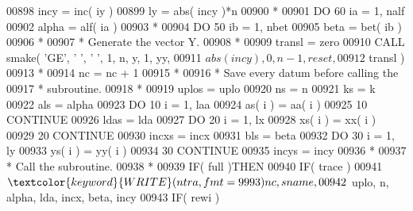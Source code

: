 \begin{DoxyCode}
00898                      incy = inc( iy )
00899                      ly = abs( incy )*n
00900 \textcolor{comment}{*}
00901                      \textcolor{keywordflow}{DO} 60 ia = 1, nalf
00902                         alpha = alf( ia )
00903 \textcolor{comment}{*}
00904                         \textcolor{keywordflow}{DO} 50 ib = 1, nbet
00905                            beta = bet( ib )
00906 \textcolor{comment}{*}
00907 \textcolor{comment}{*                          Generate the vector Y.}
00908 \textcolor{comment}{*}
00909                            transl = zero
00910                            \textcolor{keyword}{CALL }smake( \textcolor{stringliteral}{'GE'}, \textcolor{stringliteral}{' '}, \textcolor{stringliteral}{' '}, 1, n, y, 1, yy,
00911      $                                 abs( incy ), 0, n - 1, reset,
00912      $                                 transl )
00913 \textcolor{comment}{*}
00914                            nc = nc + 1
00915 \textcolor{comment}{*}
00916 \textcolor{comment}{*                          Save every datum before calling the}
00917 \textcolor{comment}{*                          subroutine.}
00918 \textcolor{comment}{*}
00919                            uplos = uplo
00920                            ns = n
00921                            ks = k
00922                            als = alpha
00923                            \textcolor{keywordflow}{DO} 10 i = 1, laa
00924                               as( i ) = aa( i )
00925    10                      \textcolor{keywordflow}{CONTINUE}
00926                            ldas = lda
00927                            \textcolor{keywordflow}{DO} 20 i = 1, lx
00928                               xs( i ) = xx( i )
00929    20                      \textcolor{keywordflow}{CONTINUE}
00930                            incxs = incx
00931                            bls = beta
00932                            \textcolor{keywordflow}{DO} 30 i = 1, ly
00933                               ys( i ) = yy( i )
00934    30                      \textcolor{keywordflow}{CONTINUE}
00935                            incys = incy
00936 \textcolor{comment}{*}
00937 \textcolor{comment}{*                          Call the subroutine.}
00938 \textcolor{comment}{*}
00939                            \textcolor{keywordflow}{IF}( full )\textcolor{keywordflow}{THEN}
00940                               \textcolor{keywordflow}{IF}( trace )
00941      $                           \textcolor{keyword}{WRITE}( ntra, fmt = 9993 )nc, sname,
00942      $                           uplo, n, alpha, lda, incx, beta, incy
00943                               \textcolor{keywordflow}{IF}( rewi )

\end{DoxyCode}
